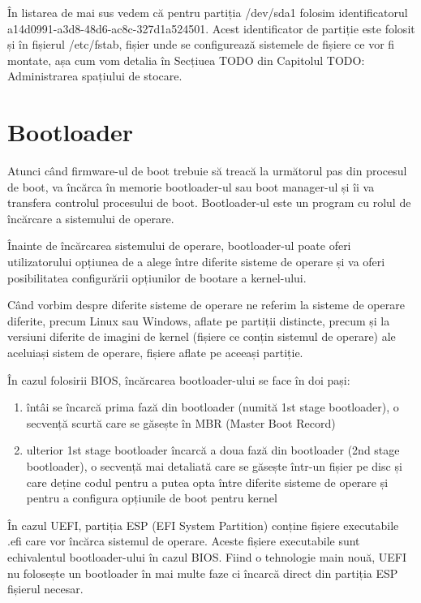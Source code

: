 În listarea de mai sus vedem că pentru partiția /dev/sda1 folosim
identificatorul a14d0991-a3d8-48d6-ac8c-327d1a524501. Acest identificator de
partiție este folosit și în fișierul /etc/fstab, fișier unde se configurează
sistemele de fișiere ce vor fi montate, așa cum vom detalia în Secțiuea TODO din
Capitolul TODO: Administrarea spațiului de stocare.

\section{Bootloader}
\label{sec:boot-bootloader}

Atunci când firmware-ul de boot trebuie să treacă la următorul pas din procesul
de boot, va încărca în memorie bootloader-ul sau boot manager-ul și îi va
transfera controlul procesului de boot. Bootloader-ul este un program cu rolul
de încărcare a sistemului de operare.

Înainte de încărcarea sistemului  de operare, bootloader-ul poate oferi
utilizatorului opțiunea de a alege între diferite sisteme de operare și va oferi
posibilitatea configurării opțiunilor de bootare a kernel-ului.

Când vorbim despre diferite sisteme de operare ne referim la sisteme de operare
diferite, precum Linux sau Windows, aflate pe partiții distincte, precum și la
versiuni diferite de imagini de kernel (fișiere ce conțin sistemul de operare)
ale aceluiași sistem de operare, fișiere aflate pe aceeași partiție.

În cazul folosirii BIOS, încărcarea bootloader-ului se face în doi pași:

\begin{enumerate}
	\item întâi se încarcă prima fază din bootloader (numită 1st stage
		bootloader), o secvență scurtă care se găsește în MBR (Master
		Boot Record)
	\item ulterior 1st stage bootloader încarcă a doua fază din bootloader
		(2nd stage bootloader), o secvență mai detaliată care se găsește
		într-un fișier pe disc și care deține codul pentru a putea opta
		între diferite sisteme de operare și pentru a configura
		opțiunile de boot pentru kernel
\end{enumerate}

În cazul UEFI, partiția ESP (EFI System Partition) conține fișiere executabile
.efi care vor încărca sistemul de operare. Aceste fișiere executabile sunt
echivalentul bootloader-ului în cazul BIOS. Fiind o tehnologie main nouă, UEFI
nu folosește un bootloader în mai multe faze ci încarcă direct din partiția ESP
fișierul necesar.

